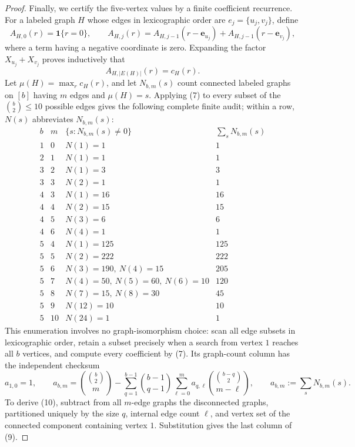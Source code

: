 \documentclass{article}
\begin{document}
\begin{proof}
Finally, we certify the five-vertex values by a finite coefficient recurrence.  For a labeled graph \(H\) whose edges in lexicographic order are \(e_j=\{u_j,v_j\}\), define
\[
 A_{H,0}(r)=\mathbf 1\{r=0\},
 \qquad
 A_{H,j}(r)=A_{H,j-1}(r-\mathbf e_{u_j})
             +A_{H,j-1}(r-\mathbf e_{v_j}),
\tag{7}
\]
where a term having a negative coordinate is zero.  Expanding the factor \(X_{u_j}+X_{v_j}\) proves inductively that
\[
 A_{H,|E(H)|}(r)=c_H(r).
\tag{8}
\]
Let \(\mu(H)=\max_r c_H(r)\), and let \(N_{b,m}(s)\) count connected labeled graphs on \([b]\) having \(m\) edges and \(\mu(H)=s\).  Applying (7) to every subset of the \(\binom b2\leq10\) possible edges gives the following complete finite audit; within a row, \(N(s)\) abbreviates \(N_{b,m}(s)\):
\[
\begin{array}{c|c|l|c}
b&m&\{s:N_{b,m}(s)\ne0\}&\sum_sN_{b,m}(s)\\ \hline
1&0&N(1)=1&1\\
2&1&N(1)=1&1\\
3&2&N(1)=3&3\\
3&3&N(2)=1&1\\
4&3&N(1)=16&16\\
4&4&N(2)=15&15\\
4&5&N(3)=6&6\\
4&6&N(4)=1&1\\
5&4&N(1)=125&125\\
5&5&N(2)=222&222\\
5&6&N(3)=190,\ N(4)=15&205\\
5&7&N(4)=50,\ N(5)=60,\ N(6)=10&120\\
5&8&N(7)=15,\ N(8)=30&45\\
5&9&N(12)=10&10\\
5&10&N(24)=1&1
\end{array}
\tag{9}
\]
This enumeration involves no graph-isomorphism choice: scan all edge subsets in lexicographic order, retain a subset precisely when a search from vertex \(1\) reaches all \(b\) vertices, and compute every coefficient by (7).  Its graph-count column has the independent checksum
\[
 a_{1,0}=1,
 \qquad
 a_{b,m}=\binom{\binom b2}{m}
 -\sum_{q=1}^{b-1}\binom{b-1}{q-1}
   \sum_{\ell=0}^{m}a_{q,\ell}
   \binom{\binom{b-q}{2}}{m-\ell},
 \qquad a_{b,m}:=\sum_sN_{b,m}(s).
\tag{10}
\]
To derive (10), subtract from all \(m\)-edge graphs the disconnected graphs, partitioned uniquely by the size \(q\), internal edge count \(\ell\), and vertex set of the connected component containing vertex \(1\).  Substitution gives the last column of (9).


\end{proof}
\end{document}
